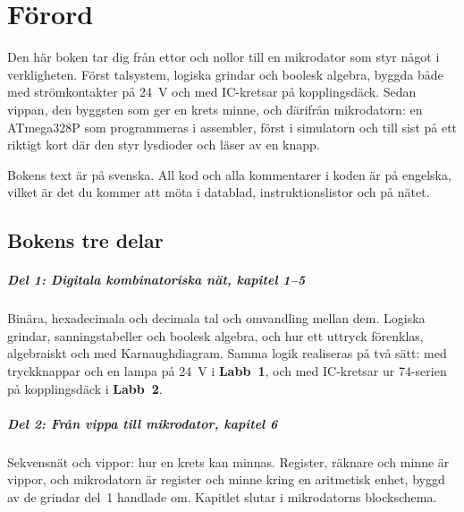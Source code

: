 
\chapter{Förord}

Den här boken tar dig från ettor och nollor till en mikrodator som styr något i verkligheten.
Först talsystem, logiska grindar och boolesk algebra, byggda både med strömkontakter på 24~V och
med IC-kretsar på kopplingsdäck. Sedan vippan, den byggsten som ger en krets minne, och därifrån
mikrodatorn: en ATmega328P som programmeras i assembler, först i simulatorn och till sist på ett
riktigt kort där den styr lysdioder och läser av en knapp.

Bokens text är på svenska. All kod och alla kommentarer i koden är på engelska, vilket är det du
kommer att möta i datablad, instruktionslistor och på nätet.

\section*{Bokens tre delar}
\paragraph{Del 1: Digitala kombinatoriska nät, kapitel 1--5} Binära, hexadecimala och decimala tal
och omvandling mellan dem. Logiska grindar, sanningstabeller och boolesk algebra, och hur ett
uttryck förenklas, algebraiskt och med Karnaughdiagram. Samma logik realiseras på två sätt: med
tryckknappar och en lampa på 24~V i \textbf{Labb~1}, och med IC-kretsar ur 74-serien på
kopplingsdäck i \textbf{Labb~2}.

\paragraph{Del 2: Från vippa till mikrodator, kapitel 6} Sekvensnät och vippor: hur en krets kan
minnas. Register, räknare och minne är vippor, och mikrodatorn är register och minne kring en
aritmetisk enhet, byggd av de grindar del~1 handlade om. Kapitlet slutar i mikrodatorns
blockschema.

